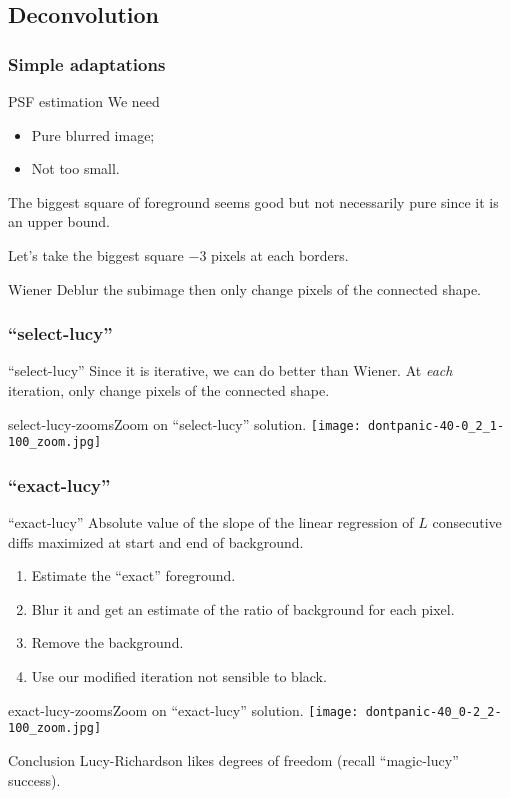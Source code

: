 \subsection{Deconvolution}
\begin{frame}
  \frametitle{Simple adaptations}
  \begin{block}{PSF estimation}
    We need
    \begin{itemize}
      \item Pure blurred image;
      \item Not too small.
    \end{itemize}
    The biggest square of foreground seems good but not necessarily
    pure since it is an upper bound.

    Let's take the biggest square $-3$ pixels at each borders.
  \end{block}
  \begin{block}{Wiener}
    Deblur the subimage then only change pixels of the connected
    shape.
  \end{block}
\end{frame}

\begin{frame}
  \frametitle{``select-lucy''}
  \begin{block}{``select-lucy''}
    Since it is iterative, we can do better than Wiener.
    At \emph{each} iteration, only change pixels of the connected
    shape.
  \end{block}
  \begin{myfig}{select-lucy-zooms}{Zoom on ``select-lucy'' solution.}
    \texttt{[image: dontpanic-40-0\_2\_1-100\_zoom.jpg]}
  \end{myfig}
\end{frame}

\begin{frame}[allowframebreaks]
  \frametitle{``exact-lucy''}
  \begin{block}{``exact-lucy''}
    Absolute value of the slope of the linear regression of $L$ consecutive diffs
    maximized at start and end of background.

    \begin{enumerate}
      \item Estimate the ``exact'' foreground.
      \item Blur it and get an estimate of the ratio of background
        for each pixel.
      \item Remove the background.
      \item Use our modified iteration not sensible to black.
    \end{enumerate}
  \end{block}
  \begin{myfig}{exact-lucy-zooms}{Zoom on ``exact-lucy'' solution.}
    \texttt{[image: dontpanic-40\_0-2\_2-100\_zoom.jpg]}
  \end{myfig}
  \begin{block}{Conclusion}
    Lucy-Richardson likes degrees of freedom (recall ``magic-lucy'' success).
  \end{block}
\end{frame}
